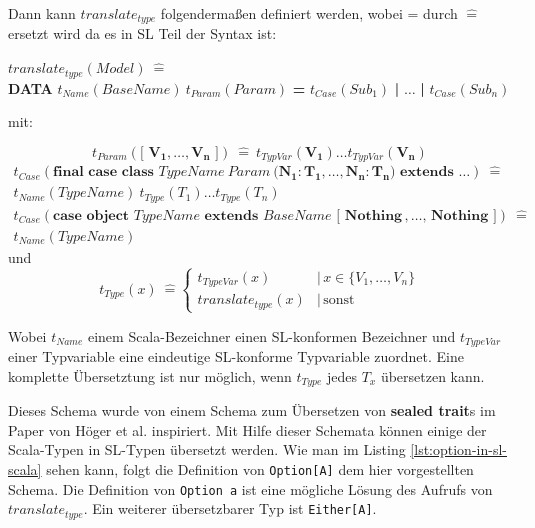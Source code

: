 \documentclass[12pt,bibtotoc]{scrreprt}
\begin{document}
Dann kann $translate_{type}$ folgendermaßen definiert werden, wobei = durch $\hat{=}$ ersetzt wird da es in SL Teil der Syntax ist:

\begin{centering}
$translate_{type}(Model)\:\hat{=}$\\
\textbf{DATA} $t_{Name}(BaseName)\:t_{Param}(Param)$ \textbf{=} $t_{Case}(Sub_1)$ \textbf{|} $\dots$ \textbf{|} $t_{Case}(Sub_n)$\\
\end{centering}

mit:

\begin{equation*}
t_{Param}( \textbf{[ } \mathbf{V_1, \dots, V_n} \textbf{ ]} )\:\hat{=}\: t_{TypVar}(\mathbf{V_1} ) \dots t_{TypVar}(\mathbf{V_n} )
\end{equation*}
\begin{gather*}
t_{Case}(\textbf{final case class }TypeName \: Param\:\textbf{(}\mathbf{N_1:T_1, \dots, N_n:T_n}\textbf{)} \textbf{ extends }\dots )\:\hat{=}\\t_{Name}(TypeName)\:t_{Type}(T_1) \dots t_{Type}(T_n)\\
t_{Case}(\textbf{case object } TypeName\textbf{ extends }BaseName\textbf{ [ Nothing}\, ,\dots,\,\textbf{Nothing ]})\:\hat{=}\\
t_{Name}(TypeName)
\end{gather*}
und
\begin{equation*}
t_{Type}(x)\:\hat{=} \begin{cases}
        t_{TypeVar}(x)  &|\, x \in \{V_1, \dots , V_n\}\\
        translate_{type}(x) &|\, \text{sonst}
        \end{cases}
\end{equation*}

Wobei $t_{Name}$ einem Scala-Bezeichner einen SL-konformen Bezeichner  und $t_{TypeVar}$ einer Typvariable eine eindeutige SL-konforme Typvariable zuordnet. Eine komplette Übersetztung ist nur möglich, wenn $t_{Type}$ jedes $T_x$ übersetzen kann.

Dieses Schema wurde von einem Schema zum Übersetzen von \textbf{sealed trait}s im Paper von Höger et al.\cite{Hoger2013} inspiriert. Mit Hilfe dieser Schemata können einige der Scala-Typen in SL-Typen übersetzt werden. Wie man im Listing \ref{lst:option-in-sl-scala} sehen kann, folgt die Definition von \lstinline!Option[A]! dem hier vorgestellten Schema. Die Definition von \lstinline!Option a! ist eine mögliche Lösung des Aufrufs von $translate_{type}$. Ein weiterer übersetzbarer Typ ist \lstinline!Either[A]!.
\end{document}
